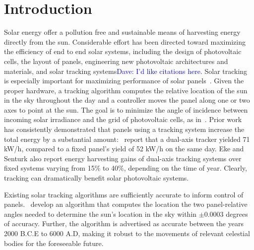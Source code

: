 \documentclass[11pt]{article}
\newcommand{\dnote}[1]{\textcolor{blue}{Dave: #1}}
\begin{document}
\section{Introduction}
Solar energy offer a pollution free and sustainable means of harvesting energy directly from the sun. Considerable effort has been directed toward maximizing the efficiency of end to end solar systems, including the design of photovoltaic cells, the layout of panels, engineering new photovoltaic architectures and materials, and solar tracking systems\dnote{I'd like citations here}. Solar tracking is especially important for maximizing performance of solar panels~\cite{Eke2012,Rizk2008,King2001}. Given the proper hardware, a tracking algorithm computes the relative location of the sun in the sky throughout the day and a controller moves the panel along one or two axes to point at the sun. The goal is to minimize the angle of incidence between incoming solar irradiance and the grid of photovoltaic cells, as in~\citet{Eke2012,Benghanem2011,King2001, kalogirou1996design}. Prior work has consistently demonstrated that panels using a tracking system increase the total energy by a substantial amount:~\citet{Eke2012} report that a dual-axis tracker yielded 71 kW/h, compared to a fixed panel's yield of 52 kW/h on the same day. Eke and Senturk also report energy harvesting gains of dual-axis tracking systems over fixed systems varying from 15\% to 40\%, depending on the time of year. Clearly, tracking can dramatically benefit solar photovoltaic systems.

Existing solar tracking algorithms are sufficiently accurate to inform control of panels.~\citet{reda2004solar} develop an algorithm that computes the location the two panel-relative angles needed to determine the sun's location in the sky within $\pm 0.0003$ degrees of accuracy. Further, the algorithm is advertised as accurate between the years 2000 B.C.E to 6000 A.D, making it robust to the movements of relevant celestial bodies for the foreseeable future.
\end{document}
